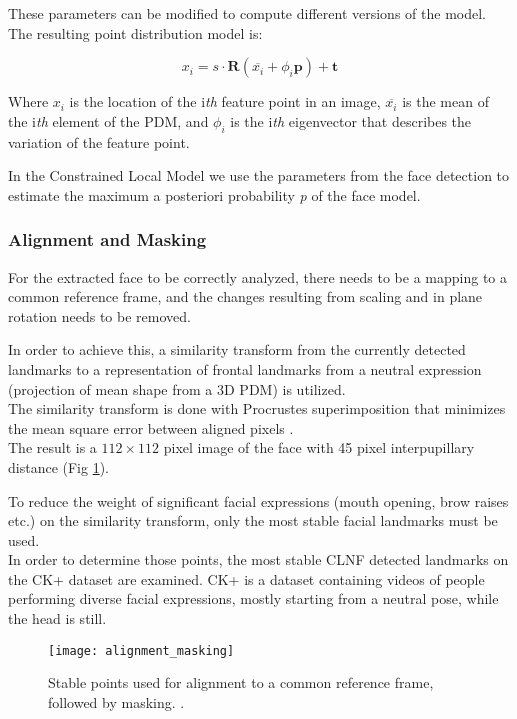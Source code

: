 These parameters can be modified to compute different versions of the model. The resulting point distribution model is:

\begin{equation} \label{eq:pdm}
	x_i = s \cdot \mathbf{R}(\overline{x_i} + \phi_i \mathbf{p}) + \mathbf{t}
\end{equation}

Where $x_i$ is the location of the i\textit{th} feature point in an image, $\overline{x_i}$ is the mean of the i\textit{th} element of the PDM, and $\phi_i$ is the i\textit{th} eigenvector that describes the variation of the feature point.

In the Constrained Local Model we use the parameters from the face detection to estimate the maximum a posteriori probability \textit{p} of the face model.

\subsubsection{Alignment and Masking}
For the extracted face to be correctly analyzed, there needs to be a mapping to a common reference frame, and the changes resulting from scaling and in plane rotation needs to be removed. 

In order to achieve this, a similarity transform from the currently detected landmarks to a representation of frontal landmarks from a neutral expression (projection of mean shape from a 3D PDM) is utilized. \\
The similarity transform is done with Procrustes superimposition that minimizes the mean square error between aligned pixels \cite{Baltru2013}.\\
The result is a $112 \times 112$ pixel image of the face with 45 pixel interpupillary distance (Fig \ref{fig:alignment_masking}). 

To reduce the weight of significant facial expressions (mouth opening, brow raises etc.) on the similarity transform, only the most stable facial landmarks must be used. \\
In order to determine those points, the most stable CLNF detected landmarks on the CK+ dataset \cite{CK+} are examined. CK+ is a dataset containing videos of people performing diverse facial expressions, mostly starting from a neutral pose, while the head is still.

\begin{figure}[H]
	\centering
	\texttt{[image: alignment\_masking]}
	\caption{Stable points used for alignment to a common reference frame, followed by masking. \cite{Baltru2015}.}
	\label{fig:alignment_masking}
\end{figure}


